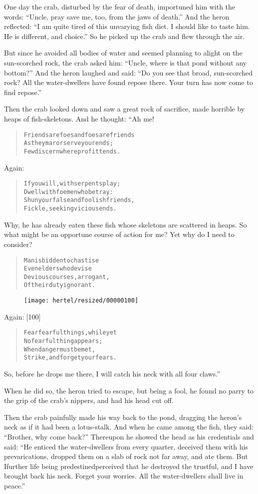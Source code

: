 \documentclass[article, twoside, 10pt]{memoir}
\renewenvironment{verbatim}{%
\begin{quote}%
\vskip -10pt%
\begin{alltt}\normalfont\small}{\end{alltt}%
\end{quote}%
\vskip -10pt
} %
\begin{document}
One day the crab, disturbed by the fear of death, importuned him
with the words:
``Uncle, pray save me, too, from the jaws of death.'' And the heron
reflected:
``I am quite tired of this unvarying fish diet. I should like to taste him. He is different, and choice.''
So he picked up the crab and flew through the air.

But since he avoided all bodies of water and seemed planning to
alight on the sun-scorched rock, the crab asked him:
``Uncle, where is that pond without any bottom?'' And the heron
laughed and said:
``Do you see that broad, sun-scorched rock? All the water-dwellers have found repose there. Your turn has now come to find repose.''

Then the crab looked down and saw a great rock of sacrifice, made
horrible by heaps of fish-skeletons. And he thought: “Ah me!

\begin{verbatim}
Friends are foes and foes are friends
As they mar or serve your ends;
Few discern where profit tends.
\end{verbatim}
Again:

\begin{verbatim}
If you will, with serpents play;
Dwell with foemen who betray:
Shun your false and foolish friends,
Fickle, seeking vicious ends.
\end{verbatim}
Why, he has already eaten these fish whose skeletons are scattered
in heaps. So what might be an opportune course of action for me?
Yet why do I need to consider?

\begin{verbatim}
Man is bidden to chastise
Even elders who devise
Devious courses, arrogant,
Of their duty ignorant.
\end{verbatim}
\begin{figure}[p]\texttt{[image: hertel/resized/00000100]}\end{figure}Again: [100]

\begin{verbatim}
Fear fearful things, while yet
    No fearful thing appears;
When danger must be met,
    Strike, and forget your fears.
\end{verbatim}
So, before he drops me there, I will catch his neck with all four
claws.”

When he did so, the heron tried to escape, but being a fool, he
found no parry to the grip of the crab's nippers, and had his head
cut off.

Then the crab painfully made his way back to the pond, dragging the
heron's neck as if it had been a lotus-stalk. And when he came
among the fish, they said: ``Brother, why come back?'' Thereupon he
showed the head as his credentials and said:
``He enticed the water-dwellers from every quarter, deceived them with his prevarications, dropped them on a slab of rock not far away, and ate them. But I{\textemdash}further life being predestined{\textemdash}perceived that he destroyed the trustful, and I have brought back his neck. Forget your worries. All the water-dwellers shall live in peace.''
\end{document}
